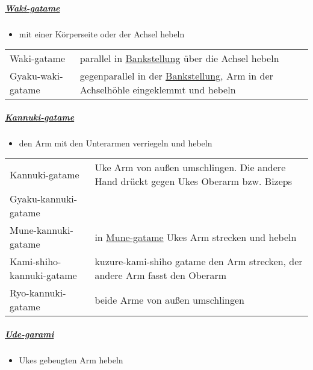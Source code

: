 \documentclass[justified, a4paper, notitlepage, captions=tableheading, nobib]{tufte-handout}
\begin{document}
\subparagraph{\hyperref[orgf02fe16]{Waki-gatame}}
\label{sec:orgd5e7037}

\begin{itemize}
\item mit einer Körperseite oder der Achsel hebeln
\end{itemize}

\begin{center}
\begin{tabular}{ll}
\label{orgf02fe16}Waki-gatame & parallel in \hyperref[org37bd524]{Bankstellung} über die Achsel hebeln\\
\label{org1705861}Gyaku-waki-gatame & gegenparallel in der \hyperref[org37bd524]{Bankstellung}, Arm in der Achselhöhle eingeklemmt und hebeln\\
\end{tabular}
\end{center}

\subparagraph{\hyperref[org5a09d6e]{Kannuki-gatame}}
\label{sec:orgb51744b}

\begin{itemize}
\item den Arm mit den Unterarmen verriegeln und hebeln
\end{itemize}

\begin{center}
\begin{tabular}{ll}
\label{org5a09d6e}Kannuki-gatame & Uke Arm von außen umschlingen. Die andere Hand drückt gegen Ukes Oberarm bzw. Bizeps\\
\label{orge89f8a3}Gyaku-kannuki-gatame & \\
\label{org9ea9bbc}Mune-kannuki-gatame & in \hyperref[org8525577]{Mune-gatame} Ukes Arm strecken und hebeln\\
\label{org9a12d47}Kami-shiho-kannuki-gatame & kuzure-kami-shiho gatame den Arm strecken, der andere Arm fasst den Oberarm\\
\label{org81f072b}Ryo-kannuki-gatame & beide Arme von außen umschlingen\\
\end{tabular}
\end{center}

\subparagraph{\hyperref[org17e995a]{Ude-garami}}
\label{sec:org3fd0290}

\begin{itemize}
\item Ukes gebeugten Arm hebeln
\end{itemize}
\end{document}
